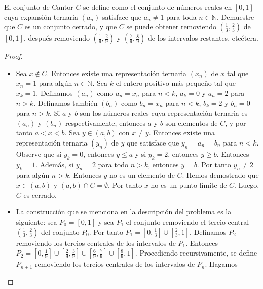 \documentclass[12pt]{article}
\newcommand{\N}{\mathbb{N}}
\newenvironment{problem}[2][Problema]{\begin{trivlist}
\item[\hskip \labelsep {\bfseries #1}\hskip \labelsep {\bfseries #2.}]}{\end{trivlist}}
\begin{document}
\begin{problem}{36}
El conjunto de Cantor $C$ se define como el conjunto de números reales en $[0, 1]$ cuya expansión ternaria $(a_n)$ satisface que $a_n \neq 1$ para toda $n \in \N.$ Demuestre que $C$ es un conjunto cerrado, y que $C$ se puede obtener removiendo $(\frac{1}{3}, \frac{2}{3})$ de $[0, 1]$, después removiendo $(\frac{1}{9}, \frac{2}{9})$ y $(\frac{7}{9}, \frac{8}{9})$ de los intervalos restantes, etcétera.
\end{problem}
\begin{proof}
\text{ }
\begin{itemize}
    \item[i.] Sea $x \notin C$. Entonces existe una representación ternaria $(x_n)$ de $x$ tal que $x_n = 1$ para algún $n \in \N$. Sea $k$ el entero positivo más pequeño tal que $x_k = 1.$ Definamos $(a_n)$ como $a_n = x_n$ para $n < k$, $a_k = 0$ y $a_n = 2$ para $n > k$. Definamos también $(b_n)$ como $b_n = x_n$ para $n < k$, $b_k = 2$ y $b_n = 0$ para $n > k$. Si $a$ y $b$ son los números reales cuya representación ternaria es $(a_n)$ y $(b_n)$ respectivamente, entonces $a$ y $b$ son elementos de $C$, y por tanto $a < x < b$. Sea $y \in (a, b)$ con $x \neq y$. Entonces existe una representación ternaria $(y_n)$ de $y$ que satisface que $y_n = a_n = b_n$ para $n < k$. Observe que si $y_k = 0$, entonces $y \leq a$ y si $y_k = 2$, entonces $y \geq b.$ Entonces $y_k = 1$. Además, si $y_n = 2$ para todo $n > k$, entonces $y = b$. Por tanto $y_n \neq 2$ para algún $n > k$. Entonces $y$ no es un elemento de $C$.  Hemos demostrado que $x \in (a, b)$ y $(a, b) \cap  C = \emptyset$. Por tanto $x$ no es un punto límite de $C$. Luego, $C$ es cerrado.
    
    \item[ii.] La construcción que se menciona en la descripción del problema es la siguiente: sea $P_0 = [0, 1]$ y sea $P_1$ el conjunto removiendo el tercio central $(\frac{1}{3}, \frac{2}{3})$ del conjunto $P_0$. Por tanto $P_1 = [0, \frac{1}{3}] \cup [\frac{2}{3}, 1] $. Definamos $P_2$ removiendo los tercios centrales de los intervalos de $P_1$. Entonces $P_2 = [0, \frac{1}{9}] \cup [\frac{2}{9}, \frac{3}{9}] \cup [\frac{6}{9}, \frac{7}{9}] \cup [\frac{8}{9}, 1]$. Procediendo recursivamente, se define $P_{n+1}$ removiendo los tercios centrales de los intervalos de $P_n$.
    Hagamos 
    

\end{itemize}
\end{proof}
\end{document}

